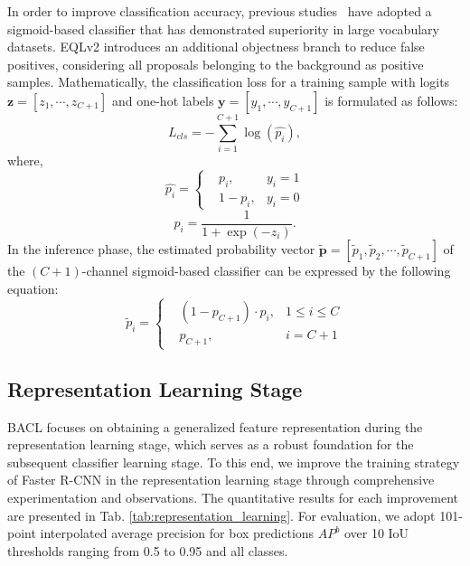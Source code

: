 \documentclass[lettersize,journal]{IEEEtran}
\begin{document}
In order to improve classification accuracy, previous studies~\cite{tan2020equalization,wang2021adaptive,tan2021equalization} have adopted a sigmoid-based classifier that has demonstrated superiority in large vocabulary datasets.
EQLv2 introduces an additional objectness branch to reduce false positives, considering all proposals belonging to the background as positive samples.
Mathematically, the classification loss for a training sample with logits $\bm{z}=[z_1,\cdots, z_{C+1}]$ and one-hot labels $\bm{y}=[y_1,\cdots, y_{C+1}]$ is formulated as follows:
\begin{equation}\label{eqn:2}
    L_{cls} = -\sum_{i=1}^{C+1}\log(\hat{p_i}),
\end{equation}
where,
\begin{equation}\label{eqn:3}
    \hat{p_i} = \left\{
        \begin{aligned}
            &p_i, & y_i=1 \\
            &1-p_i, & y_i=0
        \end{aligned}
    \right.
\end{equation}
\begin{equation}\label{eqn:4}
    p_i = \frac{1}{1+\exp(-z_i)}.
\end{equation}
In the inference phase, the estimated probability vector $\tilde{\bm{p}}=[\tilde{p}_1, \tilde{p}_2, \cdots, \tilde{p}_{C+1}]$ of the $(C+1)$-channel sigmoid-based classifier can be expressed by the following equation:
\begin{equation}\label{eqn:5}
    \tilde{p}_i = \left\{
        \begin{aligned}
            & (1-p_{C+1})\cdot p_i, & 1 \le i\le C\\
            & p_{C+1}, &i=C+1
        \end{aligned}
    \right.
\end{equation}

\subsection{Representation Learning Stage}\label{sec:3.2}

BACL focuses on obtaining a generalized feature representation during the representation learning stage, which serves as a robust foundation for the subsequent classifier learning stage.
To this end, we improve the training strategy of Faster R-CNN in the representation learning stage through comprehensive experimentation and observations.
The quantitative results for each improvement are presented in Tab. \ref{tab:representation_learning}.
For evaluation, we adopt 101-point interpolated average precision for box predictions $AP^{b}$ over 10 IoU thresholds ranging from 0.5 to 0.95 and all classes.
\end{document}
